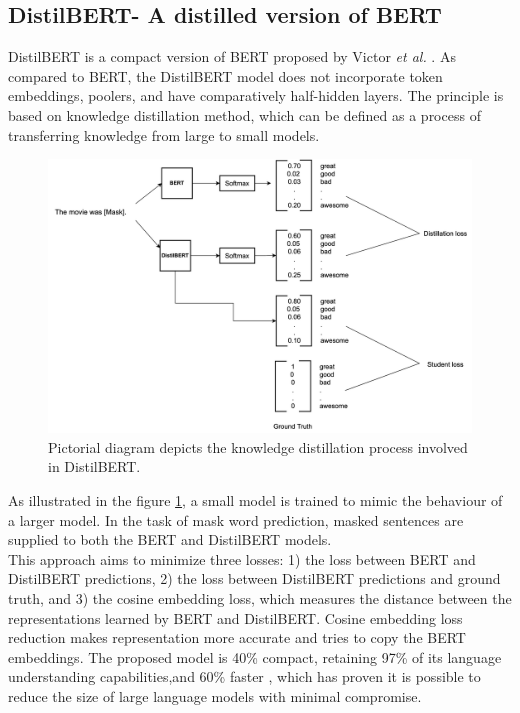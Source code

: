 \documentclass[%
	BCOR=8mm, %
	DIV=12,
	toc=bibliography, %
	toc=listof, %
	oneside, %
	egregdoesnotlikesansseriftitles, %
	]{scrbook}
\begin{document}
\subsection{DistilBERT- A distilled version of BERT}
DistilBERT is a compact version of BERT proposed by Victor \textit{et al.} \cite{sanh_distilbert_2020}. As compared to BERT, the DistilBERT model does not incorporate token embeddings, poolers, and have comparatively half-hidden layers. The principle is based on knowledge distillation \cite{hinton_distilling_2015} method, which can be defined as a process of transferring knowledge from large to small models. \\
\begin{figure}[H]
    \centering
    \includegraphics[width=0.85\linewidth]{img/DistilBERT.png}
    \caption[Diagram of DistilBERT training.]{ Pictorial diagram depicts the knowledge distillation process involved in  DistilBERT.}
    \label{fig:DistilBERT}
\end{figure}
As illustrated in the figure \ref{fig:DistilBERT}, a small model is trained to mimic the behaviour of a larger model. In the task of mask word prediction, masked sentences are supplied to both the BERT and DistilBERT models.\\
This approach aims to minimize three losses: 1) the loss between BERT and DistilBERT predictions, 2) the loss between DistilBERT predictions and ground truth, and 3) the cosine embedding loss, which measures the distance between the representations learned by BERT and DistilBERT. Cosine embedding loss reduction makes representation more accurate and tries to copy the BERT embeddings. The proposed model is 40\% compact, retaining 97\% of its language understanding capabilities,and 60\% faster \cite{sanh_distilbert_2020}, which has proven it is possible to reduce the size of large language models with minimal compromise.
\end{document}

